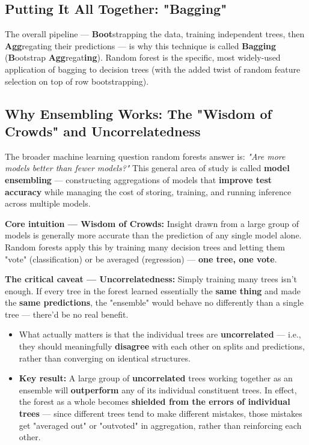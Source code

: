 \documentclass[12pt,openany]{book}
\begin{document}
\subsection{Putting It All Together: "Bagging"}


The overall pipeline --- \textbf{Boot}strapping the data, training independent trees, then \textbf{Agg}regating their predictions --- is why this technique is called \textbf{Bagging} (\textbf{B}ootstrap \textbf{Agg}regat\textbf{ing}). Random forest is the specific, most widely-used application of bagging to decision trees (with the added twist of random feature selection on top of row bootstrapping).

\medskip


\subsection{Why Ensembling Works: The "Wisdom of Crowds" and Uncorrelatedness}


The broader machine learning question random forests answer is: \textit{"Are more models better than fewer models?"} This general area of study is called \textbf{model ensembling} --- constructing aggregations of models that \textbf{improve test accuracy} while managing the cost of storing, training, and running inference across multiple models.

\textbf{Core intuition --- Wisdom of Crowds:} Insight drawn from a large group of models is generally more accurate than the prediction of any single model alone. Random forests apply this by training many decision trees and letting them "vote" (classification) or be averaged (regression) --- \textbf{one tree, one vote}.

\textbf{The critical caveat --- Uncorrelatedness:} Simply training many trees isn't enough. If every tree in the forest learned essentially the \textbf{same thing} and made the \textbf{same predictions}, the "ensemble" would behave no differently than a single tree --- there'd be no real benefit.

\begin{itemize}[leftmargin=*]
    \item What actually matters is that the individual trees are \textbf{uncorrelated} --- i.e., they should meaningfully \textbf{disagree} with each other on splits and predictions, rather than converging on identical structures.
    \item \textbf{Key result:} A large group of \textbf{uncorrelated} trees working together as an ensemble will \textbf{outperform} any of its individual constituent trees. In effect, the forest as a whole becomes \textbf{shielded from the errors of individual trees} --- since different trees tend to make different mistakes, those mistakes get "averaged out" or "outvoted" in aggregation, rather than reinforcing each other.

\end{itemize}
\end{document}
